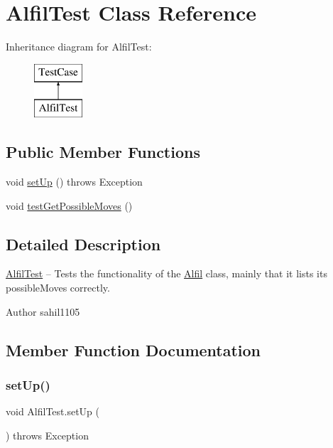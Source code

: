 \hypertarget{class_alfil_test}{}\section{Alfil\+Test Class Reference}
\label{class_alfil_test}
Inheritance diagram for Alfil\+Test\+:\begin{figure}[H]
\begin{center}
\leavevmode
\includegraphics[height=2.000000cm]{class_alfil_test}
\end{center}
\end{figure}
\subsection*{Public Member Functions}
\begin{DoxyCompactItemize}
\item 
void \mbox{\hyperlink{class_alfil_test_a31745e3ed397f342b18141ff50033268}{set\+Up}} ()  throws Exception 
\item 
void \mbox{\hyperlink{class_alfil_test_a2cf7e21629af8f626baa28cab4f8ca6d}{test\+Get\+Possible\+Moves}} ()
\end{DoxyCompactItemize}


\subsection{Detailed Description}
\mbox{\hyperlink{class_alfil_test}{Alfil\+Test}} -- Tests the functionality of the \mbox{\hyperlink{class_alfil}{Alfil}} class, mainly that it lists its possible\+Moves correctly. \begin{DoxyAuthor}{Author}
sahil1105 
\end{DoxyAuthor}


\subsection{Member Function Documentation}
\mbox{\label{class_alfil_test_a31745e3ed397f342b18141ff50033268}} 
\subsubsection{\texorpdfstring{set\+Up()}{setUp()}}
{\footnotesize\ttfamily void Alfil\+Test.\+set\+Up (\begin{DoxyParamCaption}{ }\end{DoxyParamCaption}) throws Exception}


